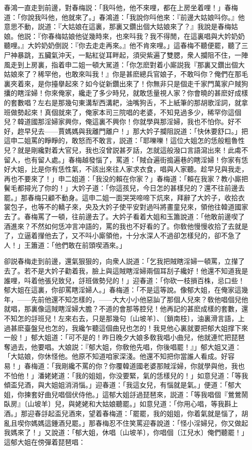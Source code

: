 春鴻一直走到前邊，對春梅説：「我呌他，他不來哩，都在上房坐着哩！」春梅道：「你說我呌他，他就來了。」春鴻道：「我說你呌他來：『前邊大姑娘呌你。』他意思不動，説道：『大姑娘在這裏，那裏又鑽出個大姑娘來了？』我說是春梅姑娘。他説：『你春梅姑娘他従幾時來，也來呌我？我不得閒，在這裏唱與大妗奶奶聽哩。』大妗奶奶倒説：『你去走走再來。』他不肯來哩。」這春梅不聽便罷，聽了三尸神暴跳，五臟氣沖天，一點紅従耳畔起，須臾紫遍了雙腮，衆人攔阻不住，一陣風走到上房裏，指着申二姐一頓大駡道：「你怎麽對着小廝説我『那裏又鑽出個大姑娘來了？稀罕他，也敢來叫我！』你是甚麽總兵官娘子，不敢呌你？俺們在那毛裏夾着來，是你擡擧起來？如今従新鑽出來了！你無非只是個走千家門萬家户賊狗攮的瞎淫婦！你來俺家，纔走了多少時兒，就敢恁量視人家？你會曉的甚麽好成樣的套數唱？左右是那幾句東溝犁西溝耙，油嘴狗舌，不上紙筆的那胡歌淫詞，就拿班做勢起來！真個就來了，俺家本司三院唱的老婆，不知見過多少，稀罕你這個兒？韓道國那淫婦家興你，俺這裏不興你！你就學與那淫婦，我也不怕你。好不好，趂早兒去——賈媽媽與我離門離户！」那大妗子攔阻説道：「快休要舒口。」把這申二姐罵的睜睜的，敢怒而不敢言，説道：「耶嚛嚛！這位大姐怎的恁般粗魯性兒？就是剛纔對着大官兒，我也沒曾説甚歹話，怎就這般潑口言語瀉出來！此䖏不留人，也有留人處。」春梅越發惱了，罵道：「賊㒲遍街搗遍巷的瞎淫婦！你家有恁好大姐，比是你有恁性氣，不該出來往人家求衣食，唱與人家聽。趁早兒與我走，再也不要來了！」申二姐道：「我没的賴在你家？」春梅道：「賴在我家？教小廝把鬢毛都撏光了你的！」大妗子道：「你這孩兒，今日怎的甚樣兒的？還不往前邊去罷。」那春梅只顧不動身。這申二姐一面哭哭啼啼下炕來，拜辭了大妗子，收拾衣裳包子，也等不的轎子來，央及大妗子使平安對過呌將畫童兒來，領他往韓道國家去了。春梅罵了一頓，往前邊去了。大妗子看着大姐和玉簫說道：「他敢前邊喫了酒進來？不然如何恁冲言冲語的，罵的我也不好看的了。你敎他慢慢收拾了去就是了，立逼着攆他去了，又不呌小廝領他，十分水深人不過卻怎樣兒的，卻不急了人！」王簫道：「他們敢在前頭喫酒來。」

卻説春梅走到前邊，還氣狠狠的，向衆人説道：「乞我把賊瞎淫婦一頓罵，立攆了去了。若不是大妗子勸着我，臉上與這賊瞎淫婦兩個耳刮子纔好！他還不知道我是誰哩，呌着他張兒致兒，㧱班做勢兒的！」迎春道：「你砍一枝損百株，忌口些！郁大姐在這裏，你卻罵瞎淫婦人。」春梅道：「不是這等說。像郁大姐，在俺家這幾年，——先前他還不知怎樣的，——大大小小他惡訕了那個人兒來？敎他唱個兒他就唱，那裏像這賊瞎淫婦大膽？不道的會那等腔兒！他再記的甚麽成樣的套數，還不知怎的㧱班兒！左來右去，只是那幾句〔山坡羊〕、〔鎖南枝〕，油裏滑言語，上過甚麽臺盤兒也怎的，我纔乍聽這個曲兒也怎的！我見他心裏就要把郁大姐撑下來一般！」郁大姐道：「可不是的！昨日晚夕大娘多敎我唱小曲兒，他就連忙把琵琶奪過去，他要唱。大娘説：『郁大姐，你敎他先唱，你後唱罷！』」郁大姐又道：「大姑娘，你休怪他。他原不知道咱家深淺。他還不知把你當誰人看成。好容易！」春梅道：「我剛纔不罵的你？你覆韓道國老婆那賊淫婦，你就學與他，我也不怕他！」潘姥姥道：「我的姐姐，你没要緊，氣的恁樣兒的！」如意兒道：「等我傾盃兒酒，與大姐姐消消惱。」迎春道：「我這女兒，有惱就是氣。」便道：「郁大姐，你揀套好曲兒唱個伏侍他。」這郁大姐㧱過琵琶來，説道：「等我唱個『鶯鶯鬧臥房』〔山坡羊〕兒，與姥姥和大姑娘聽罷。」如意兒道：「你用心唱，等我斟上酒。」那迎春㧱起盃兒酒來，望着春梅道：「罷罷，我的姐姐，你着氣就是惱了，胡亂且喫你媽媽這鍾酒兒罷。」那春梅忍不住笑罵迎春說道：「怪小淫婦兒，你又做起我媽來了！」又說道：「郁大姐，休唱〔山坡羊〕，你唱個〔江兒水〕俺們聽罷！」這郁大姐在傍彈着琵琶唱：


